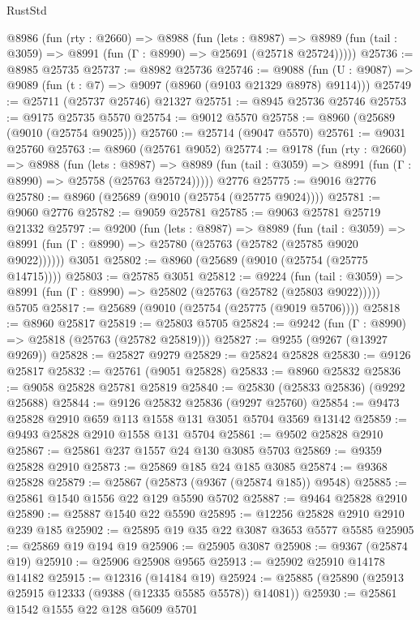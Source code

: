 \begin{lexlean}{RustStd}
\begin{coremodule}
  @8986
    (fun (rty : @2660) =>
    @8988
      (fun (lets : @8987) =>
      @8989 (fun (tail : @3059) => @8991 (fun (Γ : @8990) => @25691 (@25718 @25724)))))
@25736 := @8985 @25735
@25737 := @8982 @25736
@25746 := @9088
    (fun (U : @9087) => @9089 (fun (t : @7) => @9097 (@8960 (@9103 @21329 @8978) @9114)))
@25749 := @25711 (@25737 @25746) @21327
@25751 := @8945 @25736 @25746
@25753 := @9175 @25735 @5570
@25754 := @9012 @5570
@25758 := @8960 (@25689 (@9010 (@25754 @9025)))
@25760 := @25714 (@9047 @5570)
@25761 := @9031 @25760
@25763 := @8960 (@25761 @9052)
@25774 := @9178
    (fun (rty : @2660) =>
    @8988
      (fun (lets : @8987) =>
      @8989 (fun (tail : @3059) => @8991 (fun (Γ : @8990) => @25758 (@25763 @25724)))))
    @2776
@25775 := @9016 @2776
@25780 := @8960 (@25689 (@9010 (@25754 (@25775 @9024))))
@25781 := @9060 @2776
@25782 := @9059 @25781
@25785 := @9063 @25781 @25719 @21332
@25797 := @9200
    (fun (lets : @8987) =>
    @8989
      (fun (tail : @3059) =>
      @8991 (fun (Γ : @8990) => @25780 (@25763 (@25782 (@25785 @9020 @9022))))))
    @3051
@25802 := @8960 (@25689 (@9010 (@25754 (@25775 @14715))))
@25803 := @25785 @3051
@25812 := @9224
    (fun (tail : @3059) => @8991 (fun (Γ : @8990) => @25802 (@25763 (@25782 (@25803 @9022)))))
    @5705
@25817 := @25689 (@9010 (@25754 (@25775 (@9019 @5706))))
@25818 := @8960 @25817
@25819 := @25803 @5705
@25824 := @9242 (fun (Γ : @8990) => @25818 (@25763 (@25782 @25819)))
@25827 := @9255 (@9267 (@13927 @9269))
@25828 := @25827 @9279
@25829 := @25824 @25828
@25830 := @9126 @25817
@25832 := @25761 (@9051 @25828)
@25833 := @8960 @25832
@25836 := @9058 @25828 @25781 @25819
@25840 := @25830 (@25833 @25836) (@9292 @25688)
@25844 := @9126 @25832 @25836 (@9297 @25760)
@25854 := @9473 @25828 @2910 @659 @113 @1558 @131 @3051 @5704 @3569 @13142
@25859 := @9493 @25828 @2910 @1558 @131 @5704
@25861 := @9502 @25828 @2910
@25867 := @25861 @237 @1557 @24 @130 @3085 @5703
@25869 := @9359 @25828 @2910
@25873 := @25869 @185 @24 @185 @3085
@25874 := @9368 @25828
@25879 := @25867 (@25873 (@9367 (@25874 @185)) @9548)
@25885 := @25861 @1540 @1556 @22 @129 @5590 @5702
@25887 := @9464 @25828 @2910
@25890 := @25887 @1540 @22 @5590
@25895 := @12256 @25828 @2910 @2910 @239 @185
@25902 := @25895 @19 @35 @22 @3087 @3653 @5577 @5585
@25905 := @25869 @19 @194 @19
@25906 := @25905 @3087
@25908 := @9367 (@25874 @19)
@25910 := @25906 @25908 @9565
@25913 := @25902 @25910 @14178 @14182
@25915 := @12316 (@14184 @19)
@25924 := @25885 (@25890 (@25913 @25915 @12333 (@9388 (@12335 @5585 @5578)) @14081))
@25930 := @25861 @1542 @1555 @22 @128 @5609 @5701

\end{coremodule}
\end{lexlean}
